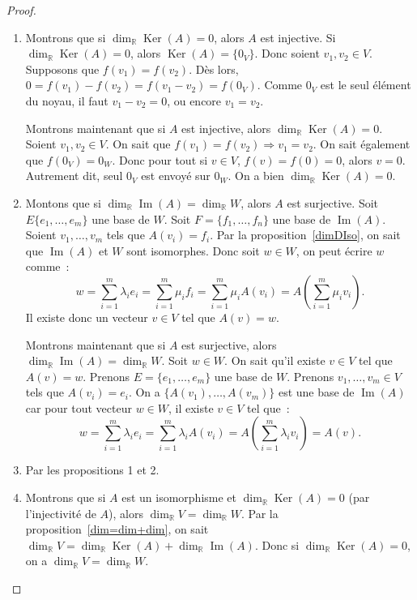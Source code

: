 \documentclass{article}
\DeclareMathOperator{\Ker}{Ker}
\DeclareMathOperator{\Imf}{Im}
\newcommand{\R}{\mathbb R}
\theoremstyle{definition}
\theoremstyle{remark}
\begin{document}
		\begin{proof}~
		\begin{enumerate}
			\item Montrons que si $\dim_\R\Ker(A) = 0$, alors $A$ est injective. Si $\dim_\R\Ker(A) = 0$, alors $\Ker(A) = \{0_V\}$. Donc soient $v_1, v_2 \in V$.
			      Supposons que $f(v_1) = f(v_2)$. Dès lors, $0 = f(v_1)-f(v_2) = f(v_1-v_2) = f(0_V)$. Comme $0_V$ est le seul élément du noyau, il faut $v_1-v_2 = 0$,
				  ou encore $v_1 = v_2$.

			      Montrons maintenant que si $A$ est injective, alors $\dim_\R\Ker(A) = 0$. Soient $v_1, v_2 \in V$. On sait que $f(v_1)=f(v_2) \Rightarrow v_1=v_2$.
				  On sait également que $f(0_V) = 0_W$. Donc pour tout si $v \in V$, $f(v) = f(0) = 0$, alors $v=0$. Autrement dit, seul $0_V$ est envoyé sur $0_W$.
				  On a bien $\dim_\R\Ker(A)=0$.

			\item Montons que si $\dim_\R\Imf(A) = \dim_\R W$, alors $A$ est surjective. Soit $E \{e_1, \dotsc, e_m\}$ une base de $W$. Soit $F = \{f_1, \dotsc, f_n\}$
			      une base de $\Imf(A)$. Soient $v_1, \dotsc, v_m$ tels que $A(v_i) = f_i$. Par la proposition~\ref{dimDIso}, on sait que $\Imf(A)$ et $W$ sont
				  isomorphes. Donc soit $w \in W$, on peut écrire $w$ comme~:
				  \[w = \sum_{i=1}^m\lambda_ie_i = \sum_{i=1}^m\mu_if_i = \sum_{i=1}^m\mu_iA(v_i) = A\left(\sum_{i=1}^m\mu_iv_i\right).\]
				  Il existe donc un vecteur $v \in V$ tel que $A(v) = w$.

			      Montrons maintenant que si $A$ est surjective, alors $\dim_\R \Imf(A)=\dim_\R W$. Soit $w \in W$. On sait qu'il existe $v \in V$ tel que $A(v) = w$.
				  Prenons $E = \{e_1, \dotsc, e_m\}$ une base de $W$. Prenons $v_1, \dotsc, v_m \in V$ tels que $A(v_i) = e_i$. On a $\{A(v_1), \dotsc, A(v_m)\}$ est une
				  base de $\Imf(A)$ car pour tout vecteur $w \in W$, il existe $v \in V$ tel que~:
				  \[w = \sum_{i=1}^m\lambda_ie_i = \sum_{i=1}^m\lambda_iA(v_i) = A\left(\sum_{i=1}^m\lambda_iv_i\right) = A(v).\]

			\item Par les propositions 1 et 2.

			\item Montrons que si $A$ est un isomorphisme et $\dim_\R\Ker(A) = 0$ (par l'injectivité de $A$), alors $\dim_\R V = \dim_\R W$.
			      Par la proposition~\ref{dim=dim+dim}, on sait $\dim_\R V = \dim_\R \Ker(A) + \dim_\R\Imf(A)$. Donc si $\dim_\R \Ker(A) = 0$, on a
				  $\dim_\R V = \dim_\R W$.


\end{enumerate}
\end{proof}
\end{document}
